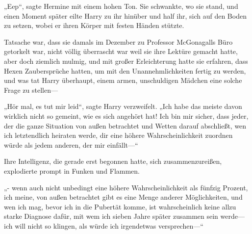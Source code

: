 „Eep“, sagte Hermine mit einem hohen Ton.
Sie schwankte, wo sie stand, und einen Moment später eilte Harry zu ihr hinüber und half ihr, sich auf den Boden zu setzen, wobei er ihren Körper mit festen Händen stützte.

Tatsache war, dass sie damals im Dezember zu Professor McGonagalls Büro getorkelt war, nicht völlig überrascht war weil sie ihre Lektüre gemacht hatte, aber doch ziemlich mulmig, und mit großer Erleichterung hatte sie erfahren, dass Hexen Zaubersprüche hatten, um mit den Unannehmlichkeiten fertig zu werden, und was tat Harry überhaupt, einem armen, unschuldigen Mädchen eine solche Frage zu stellen—

„Hör mal, es tut mir leid“, sagte Harry verzweifelt. „Ich habe das meiste davon wirklich nicht so gemeint, wie es sich angehört hat! Ich bin mir sicher, dass jeder, der die ganze Situation von außen betrachtet und Wetten darauf abschließt, wen ich letztendlich heiraten werde, dir eine höhere Wahrscheinlichkeit zuordnen würde als jedem anderen, der mir einfällt—“

Ihre Intelligenz, die gerade erst begonnen hatte, sich zusammenzureißen, explodierte prompt in Funken und Flammen.

„- wenn auch nicht unbedingt eine höhere Wahrscheinlichkeit als fünfzig Prozent, ich meine, von außen betrachtet gibt es eine Menge anderer Möglichkeiten, und wen ich mag, bevor ich in die Pubertät komme, ist wahrscheinlich keine allzu starke Diagnose dafür, mit wem ich sieben Jahre später zusammen sein werde—ich will nicht so klingen, als würde ich irgendetwas versprechen—“

